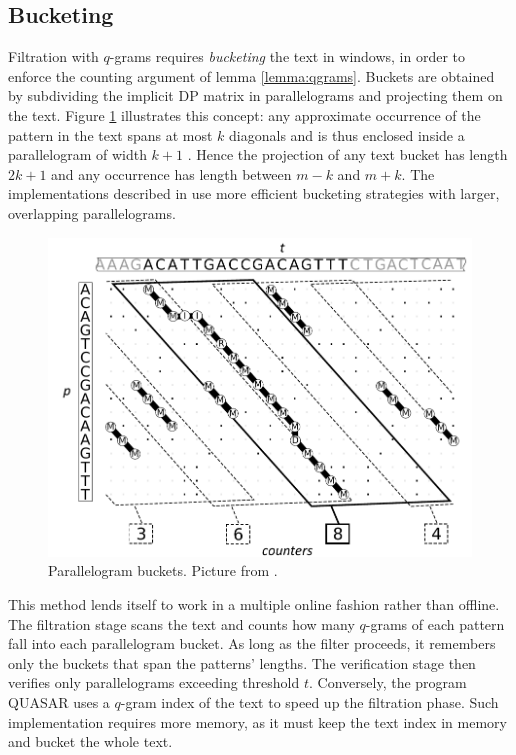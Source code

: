 \subsection{Bucketing}

Filtration with $q$-grams requires \emph{bucketing} the text in windows, in order to enforce the counting argument of lemma \ref{lemma:qgrams}.
Buckets are obtained by subdividing the implicit DP matrix in parallelograms and projecting them on the text.
Figure \ref{fig:swift} illustrates this concept: any approximate occurrence of the pattern in the text spans at most $k$ diagonals and is thus enclosed inside a parallelogram of width $k+1$ \citep{Rasmussen2006}.
Hence the projection of any text bucket has length $2k + 1$ and any occurrence has length between $m - k$ and $m + k$.
The implementations described in \citep{Rasmussen2006, Kehr2011, Weese2009} use more efficient bucketing strategies with larger, overlapping parallelograms.

\begin{figure}[h]
\begin{center}
\caption[Parallelogram buckets] {Parallelogram buckets. Picture from \citep{Weese2009}.}
\label{fig:swift}
\includegraphics[scale=0.75]{figures/swift.pdf}
\end{center}
\end{figure}

This method lends itself to work in a multiple online fashion rather than offline.
The filtration stage scans the text and counts how many $q$-grams of each pattern fall into each parallelogram bucket.
As long as the filter proceeds, it remembers only the buckets that span the patterns' lengths.
The verification stage then verifies only parallelograms exceeding threshold $t$.
Conversely, the program QUASAR \citep{Burkhardt1999} uses a $q$-gram index of the text to speed up the filtration phase.
Such implementation requires more memory, as it must keep the text index in memory and bucket the whole text.

